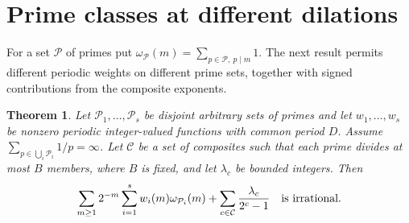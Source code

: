 \documentclass[11pt,letterpaper]{article}
\newtheorem{theorem}{Theorem}[section]
\begin{document}
\section{Prime classes at different dilations}

For a set $\mathcal P$ of primes put
$\omega_{\mathcal P}(m)=\sum_{p\in\mathcal P,\ p\mid m}1$.
The next result permits different periodic weights on different prime
sets, together with signed contributions from the composite exponents.

\begin{theorem}\label{mixcube:main}
Let $\mathcal P_1,\ldots,\mathcal P_s$ be disjoint arbitrary sets of
primes and let $w_1,\ldots,w_s$ be nonzero periodic integer-valued
functions with common period $D$. Assume
$\sum_{p\in\bigcup_i\mathcal P_i}1/p=\infty$. Let $\mathcal C$ be a
set of composites such that each prime divides at most $B$ members,
where $B$ is fixed, and let $\lambda_c$ be bounded integers. Then
\[
 \sum_{m\ge1}2^{-m}\sum_{i=1}^s w_i(m)\omega_{\mathcal P_i}(m)
       +\sum_{c\in\mathcal C}\frac{\lambda_c}{2^c-1}
 \quad\hbox{is irrational.}
\]
\end{theorem}
\end{document}
